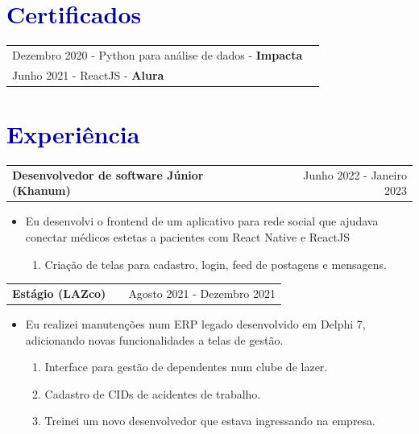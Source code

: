 \documentclass[a4paper,o12pt]{article}
\makeatletter
\newenvironment{joblong}[2]
    {
    \begin{tabularx}{\linewidth}{@{}l X r@{}}
    \textbf{#1} & \hfill &  #2 \\[3.75pt]
    \end{tabularx}
    \begin{minipage}[t]{\linewidth}
    \begin{itemize}[nosep,after=\strut, leftmargin=1em, itemsep=3pt,label=--]
    }
    {
    \end{itemize}
    \end{minipage}    
    }
\makeatother
\begin{document}
\section{{\textcolor{darkblue}{\textbf{Certificados}}}}
\begin{tabularx}{\linewidth}{@{}l X@{}}	

Dezembro 2020 - Python para análise de dados  - \textbf{Impacta} \\

Junho 2021 - ReactJS - \textbf{Alura} \\

\end{tabularx}


\section{\textcolor{darkblue}{\textbf{Experiência}}}
\begin{joblong}{Desenvolvedor de software Júnior (Khanum)}{Junho 2022 - Janeiro 2023}
\item Eu desenvolvi o frontend de um aplicativo para rede social que ajudava conectar médicos estetas a pacientes com React Native e ReactJS
    \begin{enumerate}
    \item Criação de telas para cadastro, login, feed de postagens e mensagens.
    \end{enumerate}
\end{joblong}

\begin{joblong}{Estágio (LAZco)}{Agosto 2021 - Dezembro 2021}
\item Eu realizei manutenções num ERP legado desenvolvido em Delphi 7, adicionando novas funcionalidades a telas de gestão.
	\begin{enumerate}
		\item Interface para gestão de dependentes num clube de lazer.
		\item Cadastro de CIDs de acidentes de trabalho.
		\item Treinei um novo desenvolvedor que estava ingressando na empresa.
	\end{enumerate}
	
\end{joblong}
\end{document}
